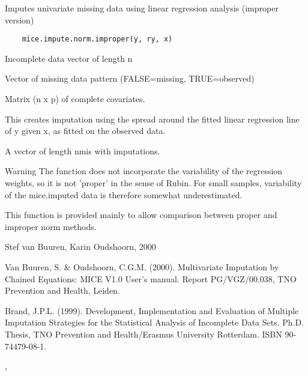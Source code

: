 \documentclass{article}
\begin{document}
\begin{Description}\relax
Imputes univariate missing data using linear regression analysis (improper version)
\end{Description}
\begin{Usage}
\begin{verbatim}
    mice.impute.norm.improper(y, ry, x)
\end{verbatim}
\end{Usage}
\begin{Arguments}
\begin{ldescription}
\item[\code{y}] Incomplete data vector of length n
\item[\code{ry}] Vector of missing data pattern (FALSE=missing, TRUE=observed)
\item[\code{x}] Matrix (n x p) of complete covariates.
\end{ldescription}
\end{Arguments}
\begin{Details}\relax
This creates imputation using the spread around the fitted 
linear regression line of y given x, as fitted on the observed data.
\end{Details}
\begin{Value}
A vector of length nmis with imputations.
\end{Value}
\begin{Section}{Warning}
The function does not incorporate the variability of the regression
weights, so it is not 'proper' in the sense of Rubin. For small samples, 
variability of the mice.imputed data is therefore somewhat underestimated.
\end{Section}
\begin{Note}\relax
This function is provided mainly to allow comparison between proper
and improper norm methods.
\end{Note}
\begin{Author}\relax
Stef van Buuren, Karin Oudshoorn, 2000
\end{Author}
\begin{References}\relax
Van Buuren, S. \& Oudshoorn, C.G.M. (2000). Multivariate Imputation by Chained Equations: 
MICE V1.0 User's manual. Report PG/VGZ/00.038, TNO Prevention and Health, Leiden.

Brand, J.P.L. (1999). Development, Implementation and Evaluation of
Multiple Imputation Strategies for the Statistical Analysis of
Incomplete Data Sets. Ph.D. Thesis, TNO Prevention
and Health/Erasmus University Rotterdam. ISBN 90-74479-08-1.
\end{References}
\begin{SeeAlso}\relax
{},  
\end{SeeAlso}
\end{document}
